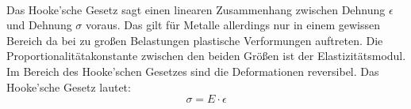 \documentclass[11pt,a4paper]{article}
\numberwithin{equation}{section}
\numberwithin{figure}{section}
\begin{document}
\\
\begin{addmargin}[25pt]{0pt}
Das Hooke'sche Gesetz sagt einen linearen Zusammenhang zwischen Dehnung $\epsilon$ und Dehnung $\sigma$ voraus. Das gilt für Metalle allerdings nur in einem gewissen Bereich da bei zu großen Belastungen plastische Verformungen auftreten. Die Proportionalitätakonstante zwischen den beiden Größen ist der Elastizitätsmodul. Im Bereich des Hooke'schen Gesetzes sind die Deformationen reversibel. Das Hooke'sche Gesetz lautet:
\begin{equation}\label{eq:Hooke_Gesetz}
    \sigma = E \cdot \epsilon
\end{equation}
\end{addmargin} 
\end{document}
